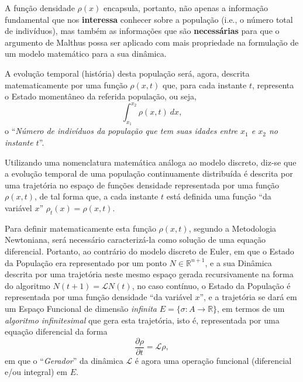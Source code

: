 A função densidade \(\rho(x)\) encapsula, portanto, não apenas a informação fundamental que nos \textbf{interessa} conhecer sobre a população (i.e., o número total de indivíduos), mas também as informações que são \textbf{necessárias} para que o argumento de Malthus possa ser aplicado com mais propriedade na formulação de um modelo matemático para a sua dinâmica.


A evolução temporal (história) desta população será, agora, descrita matematicamente por uma função \(\rho(x,t)\) que, para cada instante \(t\), representa o Estado momentâneo da referida população, ou seja, \[\displaystyle\int_{x_1}^{x_2} \rho(x, t)\ dx,\] o ``\textit{Número de indivíduos da população que tem suas idades entre \(x_1\) e \(x_2\) no instante \(t\)}''.

Utilizando uma nomenclatura matemática análoga ao modelo discreto, diz-se que a evolução temporal de uma população continuamente distribuída é descrita por uma trajetória no espaço de funções densidade representada por uma função \(\rho(x,t)\), de tal forma que, a cada instante \(t\) está definida uma função ``da variável \(x\)'' \(\rho_t(x) = \rho(x, t)\).

Para definir matematicamente esta função \(\rho(x, t)\), segundo a Metodologia Newtoniana, será necessário caracterizá-la como solução de uma equação diferencial. Portanto, ao contrário do modelo discreto de Euler, em que o Estado da População era representado por um ponto \(N \in \mathbb{R}^{n+1}\), e a sua Dinâmica descrita por uma trajetória neste mesmo espaço gerada recursivamente na forma do algoritmo \(N(t+1) = \mathcal{L} N(t)\), no caso contínuo, o Estado da População é representada por uma função densidade ``da variável \(x\)'', e a trajetória se dará em um Espaço Funcional de dimensão \textit{infinita} \(E = \{\sigma: A \to \mathbb{R}\}\), em termos de um \textit{algoritmo infinitesimal} que gera esta trajetória, isto é, representada por uma equação diferencial da forma \[\dfrac{\partial \rho}{\partial t} = \mathcal{L} \rho,\] em que o ``\textit{Gerador}'' da dinâmica \(\mathcal{L}\) é agora uma operação funcional (diferencial e/ou integral) em \(E\).

